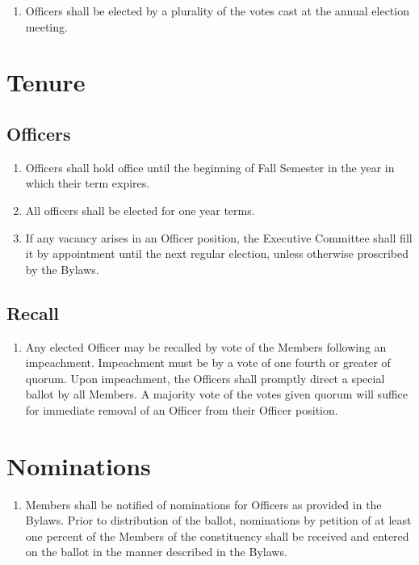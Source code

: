 \begin{enumerate}
	\item Officers shall be elected by a plurality of the votes cast at the annual election meeting.
\end{enumerate}

\section{Tenure}

\subsection{Officers}
\begin{enumerate}
	\item Officers shall hold office until the beginning of Fall Semester in the year in which their term expires.
	\item All officers shall be elected for one year terms.
	\item If any vacancy arises in an Officer position, the Executive Committee shall fill it by appointment until the next regular election, unless otherwise proscribed by the Bylaws.
\end{enumerate}

\subsection{Recall}
\begin{enumerate}
	\item Any elected Officer may be recalled by vote of the Members following an impeachment. Impeachment must be by a vote of one fourth or greater of quorum. Upon impeachment, the Officers shall promptly direct a special ballot by all Members. A majority vote of the votes given quorum will suffice for immediate removal of an Officer from their Officer position.
\end{enumerate}

\section{Nominations}
\begin{enumerate}
	\item Members shall be notified of nominations for Officers as provided in the Bylaws. Prior to distribution of the ballot, nominations by petition of at least one percent of the Members of the constituency shall be received and entered on the ballot in the manner described in the Bylaws.
\end{enumerate}

